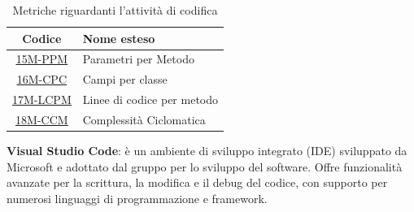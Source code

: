 \begin{table}[!h]
	\centering
	\begin{tabular}{|c|l|}
		\hline
		\textbf{Codice}                       & \textbf{Nome esteso}       \\
		\hline
		\underline{\hyperlink{15M}{15M-PPM}}  & Parametri per Metodo       \\
		\underline{\hyperlink{16M}{16M-CPC}}  & Campi per classe           \\
		\underline{\hyperlink{17M}{17M-LCPM}} & Linee di codice per metodo \\
		\underline{\hyperlink{18M}{18M-CCM}}  & Complessità Ciclomatica    \\
		\hline
	\end{tabular}
	\caption{Metriche riguardanti l'attività di codifica}
\end{table}

\textbf{Visual Studio Code}: è un ambiente di sviluppo integrato (IDE) sviluppato da Microsoft e adottato dal gruppo per lo sviluppo del software. Offre funzionalità avanzate per la scrittura, la modifica e il debug del codice, con supporto per numerosi linguaggi di programmazione e framework.

\newpage
